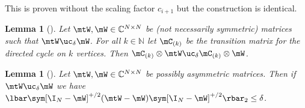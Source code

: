 \documentclass[11pt]{article}
\newtheorem{lemma}[theorem]{Lemma}
\newcommand{\N}{{\mathbb N}}
\newcommand{\C}{{\mathbb C}}
\begin{document}
This is proven without the scaling factor $c_{i+1}$ but the construction is identical.

\begin{lemma}[{\cite[Corollary 4.6]{AhmadinejadKeMuPeSiVa19}}]  %
\label{app:ucCycle}
Let $\mtW, \mW \in \C^{N\times N}$ be
%
(not necessarily symmetric)  %
matrices such that $\mtW \uc_\delta \mW$. For all $k \in \N$ let $\mC_{(k)}$ be the transition matrix for the directed cycle on $k$ vertices. Then $\mC_{(k)}\otimes\mtW \uc_\delta \mC_{(k)} \otimes \mW$.
\end{lemma}
\begin{lemma}[{\cite[Lemma 3.8]{AhmadinejadKeMuPeSiVa19}}] %
\label{app:ucLap}
Let $\mtW, \mW \in \C^{N\times N}$ be possibly asymmetric matrices. Then if $\mtW \uc_\delta \mW$ we have $\lbar\sym[\I_N-\mW]^{+/2}(\mtW-\mW)\sym[\I_N-\mW]^{+/2}\rbar_2\leq \delta$.
\end{lemma}
\end{document}
